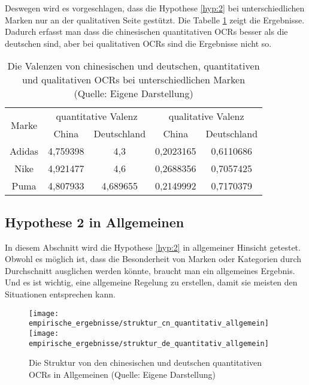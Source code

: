 Deswegen wird es vorgeschlagen, dass die Hypothese \ref{hyp:2} bei unterschiedlichen Marken nur an der qualitativen Seite gestützt. Die Tabelle \ref{tab:valenz_marken} zeigt die Ergebnisse. Dadurch erfasst man dass die chinesischen quantitativen \ac{OCRs} besser als die deutschen sind, aber bei qualitativen \ac{OCRs} sind die Ergebnisse nicht so. 

\begin{table}[h]
\centering
\begin{tabular}{|c|c|c|c|c|}
\hline
\multirow{2}{*}{Marke} & \multicolumn{2}{c|}{quantitative Valenz} & \multicolumn{2}{c|}{qualitative Valenz} \\ \cline{2-5} 
                       & China             & Deutschland          & China             & Deutschland         \\ \hline
Adidas                 & 4,759398          & 4,3                  & 0,2023165         & 0,6110686           \\ \hline
Nike                   & 4,921477          & 4,6                  & 0,2688356         & 0,7057425           \\ \hline
Puma                   & 4,807933          & 4,689655             & 0,2149992         & 0,7170379           \\ \hline
\end{tabular}
\caption[Die Valenzen von chinesischen und deutschen, quantitativen und qualitativen OCRs bei unterschiedlichen Marken]{Die Valenzen von chinesischen und deutschen, quantitativen und qualitativen \ac{OCRs} bei unterschiedlichen Marken (Quelle: Eigene Darstellung)}
\label{tab:valenz_marken}
\end{table}

\subsection{Hypothese 2 in Allgemeinen}
In diesem Abschnitt wird die Hypothese \ref{hyp:2} in allgemeiner Hinsicht getestet. Obwohl es möglich ist, dass die Besonderheit von Marken oder Kategorien durch Durchschnitt ausglichen werden könnte, braucht man ein allgemeines Ergebnis. Und es ist wichtig, eine allgemeine Regelung zu erstellen, damit sie meisten den Situationen entsprechen kann.
\begin{figure}[htb]
    {\texttt{[image: empirische\_ergebnisse/struktur\_cn\_quantitativ\_allgemein]}}    
    {\texttt{[image: empirische\_ergebnisse/struktur\_de\_quantitativ\_allgemein]}}   
    \caption[Die Struktur von den chinesischen und deutschen quantitativen OCRs in Allgemeinen]{Die Struktur von den chinesischen und deutschen quantitativen \ac{OCRs} in Allgemeinen (Quelle: Eigene Darstellung)}
    \label{fig:struktur_allgemein}
\end{figure}

